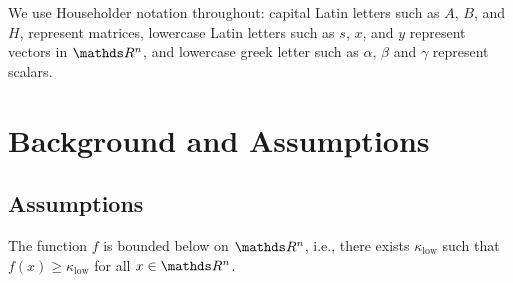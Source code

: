 \documentclass[runningheads,orivec,oribibl]{llncs}
\begin{document}
%
%
%
%
%
%
%

We use Householder notation throughout: capital Latin letters such as \(A\), \(B\), and \(H\), represent matrices, lowercase Latin letters such as \(s\), \(x\), and \(y\) represent vectors in \(\R^n\), and lowercase greek letter such as \(\alpha\), \(\beta\) and \(\gamma\) represent scalars.


\section{Background and Assumptions}
\label{sec:background}


\subsection{Assumptions}


\begin{assumption}
  \label{ass:f-bounded}
  The function \(f\) is bounded below on \(\R^n\), i.e., there exists \(\kappa_{\text{low}}\) such that \(f(x) \geq \kappa_{\text{low}}\) for all \(x \in \R^n\).
\end{assumption}
\end{document}
